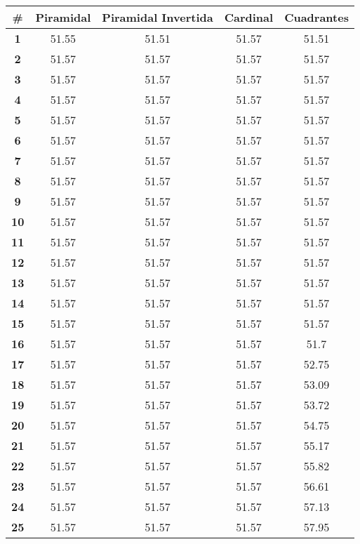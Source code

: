 \begin{longtable}{|c|c|c|c|c|}
    \hline
    \rowcolor[HTML]{ECF4FF} 
    \textbf{\#} & \textbf{Piramidal} & \textbf{Piramidal Invertida} & \textbf{Cardinal} & \textbf{Cuadrantes} \\ \hline
    \endhead
    \textbf{1} & 51.55 & 51.51 & 51.57 & 51.51 \\ \hline 
\textbf{2} & 51.57 & 51.57 & 51.57 & 51.57 \\ \hline 
\textbf{3} & 51.57 & 51.57 & 51.57 & 51.57 \\ \hline 
\textbf{4} & 51.57 & 51.57 & 51.57 & 51.57 \\ \hline 
\textbf{5} & 51.57 & 51.57 & 51.57 & 51.57 \\ \hline 
\textbf{6} & 51.57 & 51.57 & 51.57 & 51.57 \\ \hline 
\textbf{7} & 51.57 & 51.57 & 51.57 & 51.57 \\ \hline 
\textbf{8} & 51.57 & 51.57 & 51.57 & 51.57 \\ \hline 
\textbf{9} & 51.57 & 51.57 & 51.57 & 51.57 \\ \hline 
\textbf{10} & 51.57 & 51.57 & 51.57 & 51.57 \\ \hline 
\textbf{11} & 51.57 & 51.57 & 51.57 & 51.57 \\ \hline 
\textbf{12} & 51.57 & 51.57 & 51.57 & 51.57 \\ \hline 
\textbf{13} & 51.57 & 51.57 & 51.57 & 51.57 \\ \hline 
\textbf{14} & 51.57 & 51.57 & 51.57 & 51.57 \\ \hline 
\textbf{15} & 51.57 & 51.57 & 51.57 & 51.57 \\ \hline 
\textbf{16} & 51.57 & 51.57 & 51.57 & 51.7 \\ \hline 
\textbf{17} & 51.57 & 51.57 & 51.57 & 52.75 \\ \hline 
\textbf{18} & 51.57 & 51.57 & 51.57 & 53.09 \\ \hline 
\textbf{19} & 51.57 & 51.57 & 51.57 & 53.72 \\ \hline 
\textbf{20} & 51.57 & 51.57 & 51.57 & 54.75 \\ \hline 
\textbf{21} & 51.57 & 51.57 & 51.57 & 55.17 \\ \hline 
\textbf{22} & 51.57 & 51.57 & 51.57 & 55.82 \\ \hline 
\textbf{23} & 51.57 & 51.57 & 51.57 & 56.61 \\ \hline 
\textbf{24} & 51.57 & 51.57 & 51.57 & 57.13 \\ \hline 
\textbf{25} & 51.57 & 51.57 & 51.57 & 57.95 \\ \hline 

\end{longtable}
